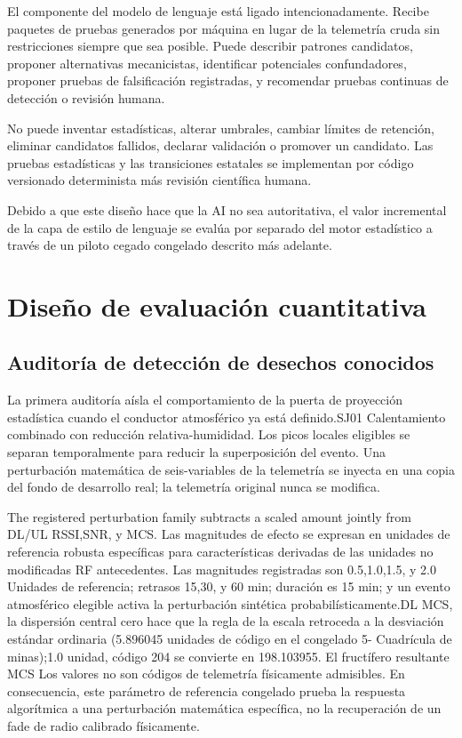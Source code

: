 \documentclass{ieeeaccess}
\begin{document}
El componente del modelo de lenguaje está ligado intencionadamente. Recibe paquetes de pruebas generados por máquina en lugar de la telemetría cruda sin restricciones siempre que sea posible. Puede describir patrones candidatos, proponer alternativas mecanicistas, identificar potenciales confundadores, proponer pruebas de falsificación registradas, y recomendar pruebas continuas de detección o revisión humana.

No puede inventar estadísticas, alterar umbrales, cambiar límites de retención, eliminar candidatos fallidos, declarar validación o promover un candidato. Las pruebas estadísticas y las transiciones estatales se implementan por código versionado determinista más revisión científica humana.

Debido a que este diseño hace que la AI no sea autoritativa, el valor incremental de la capa de estilo de lenguaje se evalúa por separado del motor estadístico a través de un piloto cegado congelado descrito más adelante.

\section{Diseño de evaluación cuantitativa}\label{diseuxf1o-de-evaluaciuxf3n-cuantitativa}

\subsection{Auditoría de detección de desechos conocidos}\label{auditoruxeda-de-detecciuxf3n-de-desechos-conocidos}

La primera auditoría aísla el comportamiento de la puerta de proyección estadística cuando el conductor atmosférico ya está definido.SJ01 Calentamiento combinado con reducción relativa-humididad. Los picos locales eligibles se separan temporalmente para reducir la superposición del evento. Una perturbación matemática de seis-variables de la telemetría se inyecta en una copia del fondo de desarrollo real; la telemetría original nunca se modifica.

The registered perturbation family subtracts a scaled amount jointly from DL/UL RSSI,SNR, y MCS. Las magnitudes de efecto se expresan en unidades de referencia robusta específicas para características derivadas de las unidades no modificadas RF antecedentes. Las magnitudes registradas son 0.5,1.0,1.5, y 2.0 Unidades de referencia; retrasos 15,30, y 60 min; duración es 15 min; y un evento atmosférico elegible activa la perturbación sintética probabilísticamente.DL MCS, la dispersión central cero hace que la regla de la escala retroceda a la desviación estándar ordinaria (5.896045 unidades de código en el congelado 5- Cuadrícula de minas);1.0 unidad, código 204 se convierte en 198.103955. El fructífero resultante MCS Los valores no son códigos de telemetría físicamente admisibles. En consecuencia, este parámetro de referencia congelado prueba la respuesta algorítmica a una perturbación matemática específica, no la recuperación de un fade de radio calibrado físicamente.
\end{document}
